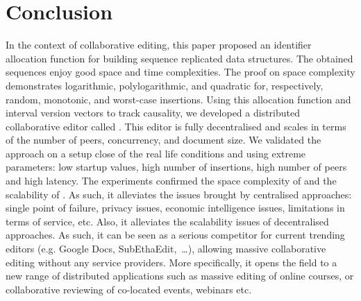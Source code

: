 
\section{Conclusion}

\label{sec:conclusion}
In the context of collaborative editing, this paper proposed an identifier
allocation function \NAME{} for building sequence replicated data
structures. The obtained sequences enjoy good space and time complexities. The
proof on space complexity demonstrates logarithmic, polylogarithmic, and
quadratic for, respectively, random, monotonic, and worst-case
insertions. Using this allocation function and interval version vectors to
track causality, we developed a distributed collaborative editor called
\EDITORNAME{}. This editor is fully decentralised and scales in terms of the
number of peers, concurrency, and document size. We validated the approach on a
setup close of the real life conditions and using extreme parameters: low
startup values, high number of insertions, high number of peers and high
latency. The experiments confirmed the space complexity of \NAME{} and the
scalability of \EDITORNAME{}. As such, it alleviates the issues brought by
centralised approaches: single point of failure, privacy issues, economic
intelligence issues, limitations in terms of service, etc. Also, it alleviates
the scalability issues of decentralised approaches. As such, it can be seen as
a serious competitor for current trending editors (e.g. Google Docs,
SubEthaEdit,~\ldots), allowing massive collaborative editing without any
service providers. More specifically, it opens the field to a new range of
distributed applications such as massive editing of online courses, or
collaborative reviewing of co-located events, webinars etc.



